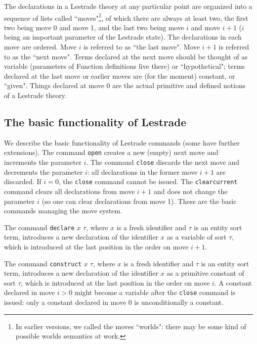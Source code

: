 \documentclass{article}
\begin{document}
The declarations in a Lestrade theory at any particular point are organized into a sequence of lists
called ``moves"\footnote{In earlier versions,  we called the moves ``worlds":  there may be some kind of possible worlds semantics at work.}, of which there are always at least two, the first two being move 0 and move 1, and the last two being move $i$ and move $i+1$ ($i$ being an important parameter of the Lestrade state).  The declarations in each move are ordered.  Move $i$ is referred to as ``the last move".  Move $i+1$ is referred to as the ``next move".  Terms declared at the next move should be thought of as variable (parameters of Function definitions live there) or ``hypothetical";  terms declared at the last move or earlier moves are (for the moment) constant, or ``given".  Things declared at move 0 are the actual primitive and defined notions of a Lestrade theory.

\subsection{The basic functionality of Lestrade}

We describe the basic functionality of Lestrade commands (some have further extensions). The command {\tt open}
creates a new (empty) next move and increments the parameter $i$.  The command
{\tt close} discards the next move and decrements the parameter $i$:  all declarations in the former move $i+1$ are discarded.  If $i=0$, the {\tt close} command cannot be issued.  The {\tt clearcurrent} command clears all declarations from move $i+1$ and does not change the parameter $i$ (so one can clear declarations from move 1).  These are the basic commands managing the move system.

The command {\tt declare} $x$ $\tau$, where $x$ is a fresh identifier and $\tau$ is an entity sort term, introduces a new declaration of the identifier $x$
as a variable of sort $\tau$, which is introduced at the last position in the order on move $i+1$.

The command {\tt construct} $x$ $\tau$, where $x$ is a fresh identifier and $\tau$ is an entity sort term, introduces a new declaration of the identifier
$x$ as a primitive constant of sort $\tau$, which is introduced at the last position in the order on move $i$.  A constant declared in move $i>0$ might become a variable after the {\tt close} command is issued:  only a constant declared in move 0 is unconditionally a constant.
\end{document}
